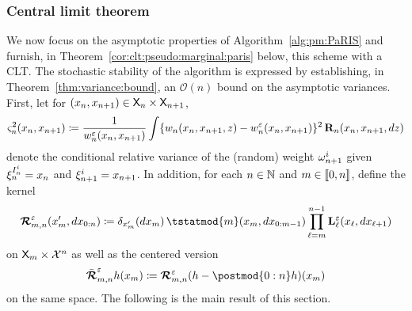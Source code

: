 
\subsubsection*{Central limit theorem}

We now focus on the asymptotic properties of Algorithm~\ref{alg:pm:PaRIS} and furnish, in Theorem~\ref{cor:clt:pseudo:marginal:paris} below, this scheme with a CLT. The stochastic stability of the algorithm is expressed by establishing, in Theorem~\ref{thm:variance:bound}, an $\mathcal{O}(n)$ bound on the asymptotic variances. First, let for $(x_n, x_{n + 1}) \in \mathsf{X}_n \times \mathsf{X}_{n + 1}$, 
\begin{multline} \label{eq:def:ukestvar}
\ukestvar{n}(x_n, x_{n + 1}) \eqdef 
\frac{1}{\wgtfuncmod{n}(x_n, x_{n + 1})} \int \{ \wgtfunc{n}(x_n, x_{n + 1}, z) - \wgtfuncmod{n}(x_n, x_{n + 1}) \}^2 \, \ukdist{n}(x_n, x_{n + 1}, \rmd z)
\end{multline}
denote the conditional relative variance of the (random) weight $\omega_{n + 1}^{i}$ given $\xi_{n}^{I_{n}^{i}} = x_n$ and $\xi_{n + 1}^{i}= x_{n + 1}$. In addition, for each $n \in \mathbb{N}$ and $m \in \llbracket 0, n \rrbracket$, define the kernel  
\begin{equation} \label{eq:def:retrokmodmod}
    \retrokmodmod_{m, n}(x_m', \rmd x_{0:n}) \eqdef \delta_{x_m'}(\rmd x_m) \,  
    \tstatmod{m}(x_m, \rmd x_{0:m - 1})
    \prod_{\ell = m}^{n - 1} \ukmod{\ell}(x_\ell, \rmd x_{\ell + 1})
\end{equation}
on $\mathsf{X}_m \times \mathcal{X}^n$ as well as the centered version 
\begin{equation} \label{eq:def:retrokmodmodnorm}
\retrokmodmodnorm_{m, n} h (x_m) \eqdef  \retrokmodmod_{m, n}(h - \postmod{0:n} h)(x_m) 
\end{equation}
on the same space. The following is the main result of this section. 
